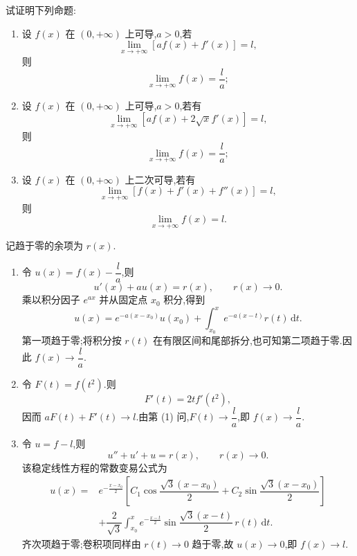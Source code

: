 \begin{example}[\markstar]
    试证明下列命题:
    \begin{enumerate}
        \item 设 $f(x)$ 在 $(0,+\infty)$ 上可导,$a>0$,若
              \[
                  \lim\limits_{x\to+\infty}[af(x)+f'(x)]=l,
              \]
              则
              \[
                  \lim\limits_{x\to+\infty}f(x)=\dfrac{l}{a};
              \]
        \item 设 $f(x)$ 在 $(0,+\infty)$ 上可导,$a>0$,若有
              \[
                  \lim\limits_{x\to+\infty}[af(x)+2\sqrt{x}f'(x)]=l,
              \]
              则
              \[
                  \lim\limits_{x\to+\infty}f(x)=\dfrac{l}{a};
              \]
        \item 设 $f(x)$ 在 $(0,+\infty)$ 上二次可导,若有
              \[
                  \lim\limits_{x\to+\infty}[f(x)+f'(x)+f''(x)]=l,
              \]
              则
              \[
                  \lim\limits_{x\to+\infty}f(x)=l.
              \]
    \end{enumerate}
\end{example}
\exampleblank

\begin{solution}
    记趋于零的余项为 $r(x)$.

    \begin{enumerate}
        \item 令 $u(x)=f(x)-\dfrac{l}{a}$,则
              \[
                  u'(x)+au(x)=r(x),
                  \qquad r(x)\to0.
              \]
              乘以积分因子 $e^{ax}$ 并从固定点 $x_0$ 积分,得到
              \[
                  u(x)=e^{-a(x-x_0)}u(x_0)
                  +\int_{x_0}^{x}e^{-a(x-t)}r(t)\,\mathrm{d}t.
              \]
              第一项趋于零;将积分按 $r(t)$ 在有限区间和尾部拆分,也可知第二项趋于零.因此 $f(x)\to\dfrac{l}{a}$.

        \item 令 $F(t)=f(t^2)$.则
              \[
                  F'(t)=2t f'(t^2),
              \]
              因而 $aF(t)+F'(t)\to l$.由第 (1) 问,$F(t)\to\dfrac{l}{a}$,即 $f(x)\to\dfrac{l}{a}$.

        \item 令 $u=f-l$,则
              \[
                  u''+u'+u=r(x),
                  \qquad r(x)\to0.
              \]
              该稳定线性方程的常数变易公式为
              \[
                  \begin{aligned}
                      u(x)={} & e^{-\frac{x-x_0}{2}}
                      \left[C_1\cos\dfrac{\sqrt3(x-x_0)}{2}
                      +C_2\sin\dfrac{\sqrt3(x-x_0)}{2}\right]                      \\
                              & +\dfrac{2}{\sqrt3}\int_{x_0}^{x}e^{-\frac{x-t}{2}}
                      \sin\dfrac{\sqrt3(x-t)}{2}\,r(t)\,\mathrm{d}t.
                  \end{aligned}
              \]
              齐次项趋于零;卷积项同样由 $r(t)\to0$ 趋于零,故 $u(x)\to0$,即 $f(x)\to l$.
    \end{enumerate}
\end{solution}

